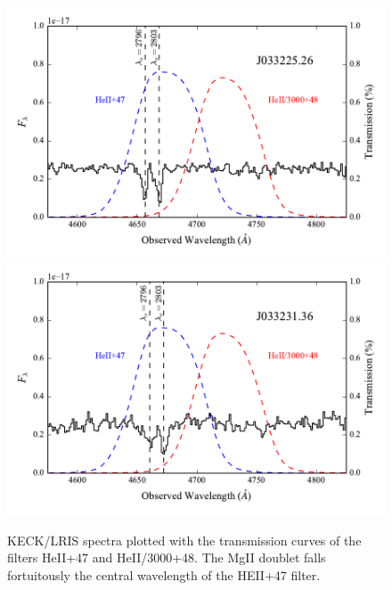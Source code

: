 \documentclass[twocolumn]{aastex6}
\begin{document}
\begin{figure}[!htb]
\includegraphics[scale=0.58]{filt_26_spectra.pdf}
\includegraphics[scale=0.58]{filt_36_spectra.pdf}
\caption{KECK/LRIS spectra plotted with the transmission curves of the filters HeII+47 and HeII/3000+48. The MgII doublet falls fortuitously the central wavelength of the HEII+47 filter. }
\label{fig:spec_images}
\end{figure}
\end{document}
